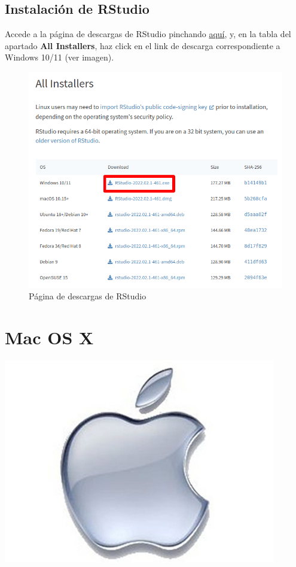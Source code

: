 \documentclass[
  title=normal,
  notoc,
  bib=normal]{mnye}
\begin{document}
\hypertarget{instalaciuxf3n-de-rstudio-1}{%
\subsection{Instalación de RStudio}\label{instalaciuxf3n-de-rstudio-1}}

Accede a la página de descargas de RStudio pinchando \href{https://rstudio.com/products/rstudio/download/\#download}{aquí}, y, en la tabla del apartado \textbf{All Installers}, haz click en el link de descarga correspondiente a Windows 10/11 (ver imagen).

\begin{figure}

{\centering \includegraphics[width=0.9\linewidth]{images/rstudio-windows} 

}

\caption{Página de descargas de RStudio}\label{fig:unnamed-chunk-13}
\end{figure}

\hypertarget{mac}{%
\section{Mac OS X}\label{mac}}

\begin{center}\includegraphics[width=0.15\linewidth]{images/os/apple} \end{center}
\end{document}
